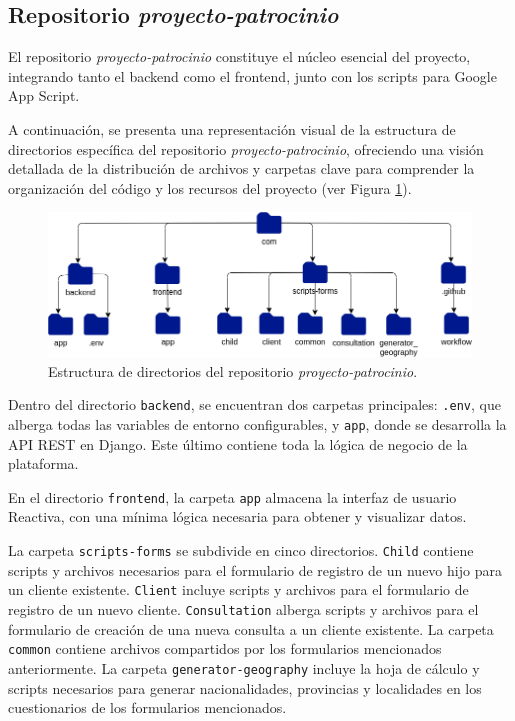 \subsection{Repositorio \textit{proyecto-patrocinio}}

El repositorio \textit{proyecto-patrocinio} constituye el núcleo esencial del proyecto, integrando tanto el backend como el frontend, junto con los scripts para Google App Script.

A continuación, se presenta una representación visual de la estructura de directorios específica del repositorio \textit{proyecto-patrocinio}, ofreciendo una visión detallada de la distribución de archivos y carpetas clave para comprender la organización del código y los recursos del proyecto (ver Figura \ref{fig:unit-directory}).

\begin{figure}[h]
    \centering
    \includegraphics[width=1\linewidth]{fig/directory.png}
    \caption{Estructura de directorios del repositorio \textit{proyecto-patrocinio}.}
    \label{fig:unit-directory}
\end{figure}

Dentro del directorio \texttt{backend}, se encuentran dos carpetas principales: \texttt{.env}, que alberga todas las variables de entorno configurables, y \texttt{app}, donde se desarrolla la API REST en Django. Este último contiene toda la lógica de negocio de la plataforma.

En el directorio \texttt{frontend}, la carpeta \texttt{app} almacena la interfaz de usuario Reactiva, con una mínima lógica necesaria para obtener y visualizar datos.

La carpeta \texttt{scripts-forms} se subdivide en cinco directorios. \texttt{Child} contiene scripts y archivos necesarios para el formulario de registro de un nuevo hijo para un cliente existente. \texttt{Client} incluye scripts y archivos para el formulario de registro de un nuevo cliente. \texttt{Consultation} alberga scripts y archivos para el formulario de creación de una nueva consulta a un cliente existente. La carpeta \texttt{common} contiene archivos compartidos por los formularios mencionados anteriormente. La carpeta \texttt{generator-geography} incluye la hoja de cálculo y scripts necesarios para generar nacionalidades, provincias y localidades en los cuestionarios de los formularios mencionados.

